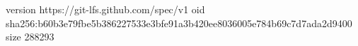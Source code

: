 version https://git-lfs.github.com/spec/v1
oid sha256:b60b3e79fbe5b386227533e3bfe91a3b420ee8036005e784b69c7d7ada2d9400
size 288293
